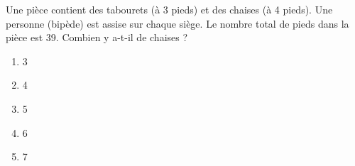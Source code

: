 Une pièce contient des tabourets (à 3 pieds) et des chaises (à 4
pieds). Une personne (bipède) est assise sur chaque siège. Le nombre
total de pieds dans la pièce est 39. Combien y a-t-il de chaises ?
\begin{multicols}{5}
  \begin{enumerate}[A/]
  \item 3
  \item 4
  \item 5
  \item 6
  \item 7
  \end{enumerate}
\end{multicols}